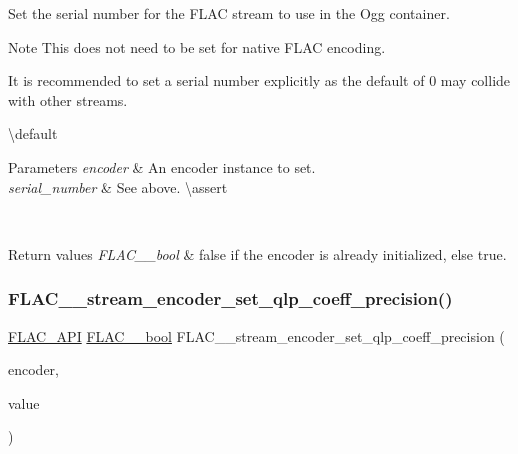 Set the serial number for the F\+L\+AC stream to use in the Ogg container.

\begin{DoxyNote}{Note}
This does not need to be set for native F\+L\+AC encoding.

It is recommended to set a serial number explicitly as the default of \textquotesingle{}0\textquotesingle{} may collide with other streams.
\end{DoxyNote}
\textbackslash{}default {} 
\begin{DoxyParams}{Parameters}
{\em encoder} & An encoder instance to set. \\
\hline
{\em serial\+\_\+number} & See above. \textbackslash{}assert 
\begin{DoxyCode}{1}
\end{DoxyCode}
 \\
\hline
\end{DoxyParams}

\begin{DoxyRetVals}{Return values}
{\em F\+L\+A\+C\+\_\+\+\_\+bool} & {\ttfamily false} if the encoder is already initialized, else {\ttfamily true}. \\
\hline
\end{DoxyRetVals}
\mbox{\label{group__flac__stream__encoder_ga0888d739c952ff73456bf90e48634514}} 
\subsubsection{\texorpdfstring{FLAC\_\_stream\_encoder\_set\_qlp\_coeff\_precision()}{FLAC\_\_stream\_encoder\_set\_qlp\_coeff\_precision()}}
{\footnotesize\ttfamily \mbox{\hyperlink{group__flac__export_ga56ca07df8a23310707732b1c0007d6f5}{F\+L\+A\+C\+\_\+\+A\+PI}} \mbox{\hyperlink{ordinals_8h_a95103469f1cbd78b8cf250194985b34e}{F\+L\+A\+C\+\_\+\+\_\+bool}} F\+L\+A\+C\+\_\+\+\_\+stream\+\_\+encoder\+\_\+set\+\_\+qlp\+\_\+coeff\+\_\+precision (\begin{DoxyParamCaption}\item[{\mbox{\hyperlink{struct_f_l_a_c_____stream_encoder}{F\+L\+A\+C\+\_\+\+\_\+\+Stream\+Encoder}} $\ast$}]{encoder,  }\item[{unsigned}]{value }\end{DoxyParamCaption})}

